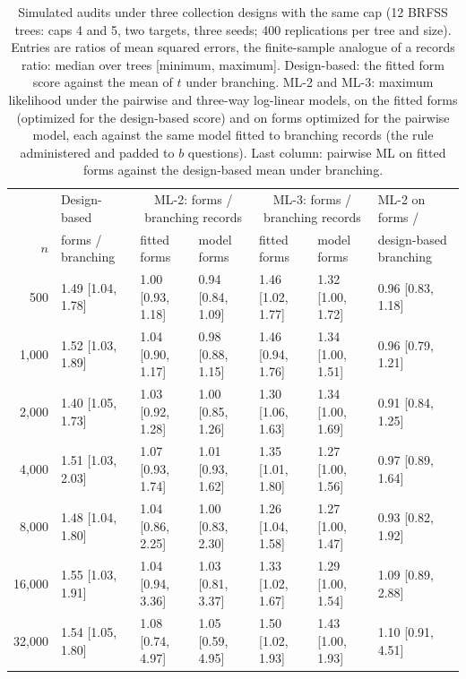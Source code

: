 \begin{table}[h]
\centering
\caption{Simulated audits under three collection designs with the same cap (12 BRFSS trees: caps 4 and 5, two targets, three seeds; 400 replications per tree and size). Entries are ratios of mean squared errors, the finite-sample analogue of a records ratio: median over trees [minimum, maximum]. Design-based: the fitted form score against the mean of $t$ under branching. ML-2 and ML-3: maximum likelihood under the pairwise and three-way log-linear models, on the fitted forms (optimized for the design-based score) and on forms optimized for the pairwise model, each against the same model fitted to branching records (the rule administered and padded to $b$ questions). Last column: pairwise ML on fitted forms against the design-based mean under branching.}
\label{tab:curve}
\scriptsize
\setlength{\tabcolsep}{3pt}
\begin{tabular}{rllllll}
\toprule
 & Design-based & \multicolumn{2}{c}{ML-2: forms / branching records} & \multicolumn{2}{c}{ML-3: forms / branching records} & ML-2 on forms / \\
$n$ & forms / branching & fitted forms & model forms & fitted forms & model forms & design-based branching \\
\midrule
500 & 1.49 [1.04, 1.78] & 1.00 [0.93, 1.18] & 0.94 [0.84, 1.09] & 1.46 [1.02, 1.77] & 1.32 [1.00, 1.72] & 0.96 [0.83, 1.18] \\
1,000 & 1.52 [1.03, 1.89] & 1.04 [0.90, 1.17] & 0.98 [0.88, 1.15] & 1.46 [0.94, 1.76] & 1.34 [1.00, 1.51] & 0.96 [0.79, 1.21] \\
2,000 & 1.40 [1.05, 1.73] & 1.03 [0.92, 1.28] & 1.00 [0.85, 1.26] & 1.30 [1.06, 1.63] & 1.34 [1.00, 1.69] & 0.91 [0.84, 1.25] \\
4,000 & 1.51 [1.03, 2.03] & 1.07 [0.93, 1.74] & 1.01 [0.93, 1.62] & 1.35 [1.01, 1.80] & 1.27 [1.00, 1.56] & 0.97 [0.89, 1.64] \\
8,000 & 1.48 [1.04, 1.80] & 1.04 [0.86, 2.25] & 1.00 [0.83, 2.30] & 1.26 [1.04, 1.58] & 1.27 [1.00, 1.47] & 0.93 [0.82, 1.92] \\
16,000 & 1.55 [1.03, 1.91] & 1.04 [0.94, 3.36] & 1.03 [0.81, 3.37] & 1.33 [1.02, 1.67] & 1.29 [1.00, 1.54] & 1.09 [0.89, 2.88] \\
32,000 & 1.54 [1.05, 1.80] & 1.08 [0.74, 4.97] & 1.05 [0.59, 4.95] & 1.50 [1.02, 1.93] & 1.43 [1.00, 1.93] & 1.10 [0.91, 4.51] \\
\bottomrule
\end{tabular}
\end{table}
